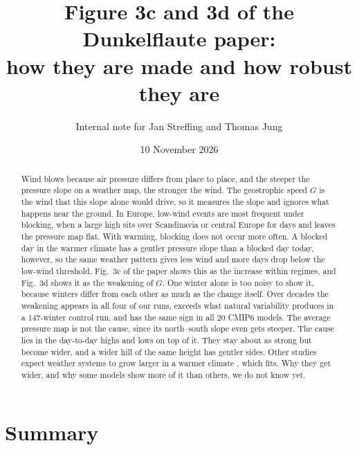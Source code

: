 \documentclass[10pt,a4paper]{article}
\title{Figure 3c and 3d of the Dunkelflaute paper:\\ how they are made and how robust they are}
\author{Internal note for Jan Streffing and Thomas Jung}
\date{10 November 2026}
\begin{document}
\maketitle

\begin{abstract}
\noindent
Wind blows because air pressure differs from place to place, and the steeper the pressure slope on a weather map, the
stronger the wind.
The geostrophic speed $G$ is the wind that this slope alone would drive, so it measures the slope and ignores what
happens near the ground.
In Europe, low-wind events are most frequent under blocking, when a large high sits over Scandinavia or central
Europe for days and leaves the pressure map flat.
With warming, blocking does not occur more often.
A blocked day in the warmer climate has a gentler pressure slope than a blocked day today, however, so the same weather
pattern gives less wind and more days drop below the low-wind threshold.
Fig.~3c of the paper shows this as the increase within regimes, and Fig.~3d shows it as the weakening of $G$.
One winter alone is too noisy to show it, because winters differ from each other as much as the change itself.
Over decades the weakening appears in all four of our runs, exceeds what natural variability produces in a
147-winter control run, and has the same sign in all 20 CMIP6 models.
The average pressure map is not the cause, since its north--south slope even gets steeper.
The cause lies in the day-to-day highs and lows on top of it.
They stay about as strong but become wider, and a wider hill of the same height has gentler sides.
Other studies expect weather systems to grow larger in a warmer climate \cite{kidston2011}, which fits.
Why they get wider, and why some models show more of it than others, we do not know yet.
\end{abstract}

\section{Summary}
\end{document}

